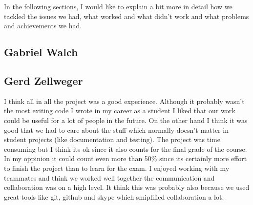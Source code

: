 \documentclass[11pt,a4paper,titlepage]{article}
\begin{document}
In the following sections, I would like to explain a bit more in detail how we tackled the issues we had, what worked and what didn't work and what problems and achievements we had.

\subsection{Gabriel Walch}


\subsection{Gerd Zellweger}
I think all in all the project was a good experience. Although it probably wasn't the most exiting code I wrote in my career as a student I liked that our work could be useful for a lot of people in the future. On the other hand I think it was good that we had to care about the stuff which normally doesn't matter in student projects (like documentation and testing). The project was time consuming but I think its ok since it also counts for the final grade of the course. In my oppinion it could count even more than 50\% since its certainly more effort to finish the project than to learn for the exam.
I enjoyed working with my teammates and think we worked well together the communication and collaboration was on a high level. It think this was probably also because we used great tools like git, github and skype which smiplified collaboration a lot.
\end{document}
